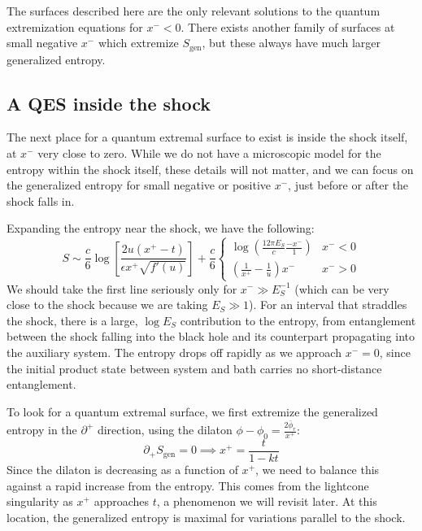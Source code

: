 \documentclass[12pt]{article}
\begin{document}
The surfaces described here are the only relevant solutions to the quantum extremization equations for $x^-<0$. There exists another family of surfaces at small negative $x^-$ which extremize $S_\text{gen}$, but these always have much larger generalized entropy.

\subsection{A QES inside the shock}

The next place for a quantum extremal surface to exist is inside the shock itself, at $x^-$ very close to zero. While we do not have a microscopic model for the entropy within the shock itself, these details will not matter, and we can focus on the generalized entropy for small negative or positive $x^-$, just before or after the shock falls in.

Expanding the entropy near the shock, we have the following:
\begin{equation}
	S \sim \frac{c}{6}\log\left[\frac{2u(x^+-t)}{\epsilon x^+\sqrt{f'(u)}}\right] + \frac{c}{6}\begin{cases}
		\log\left(\frac{12\pi E_S}{ c}  \frac{-x^-}{1}\right) &  x^-<0\\
		\left(\frac{1}{x^+}-\frac{1}{u}\right)x^- & x^- >0
	\end{cases}
\end{equation}
We should take the first line seriously only for $x^- \gg E_S^{-1}$ (which can be very close to the shock because we are taking $E_S\gg 1$). For an interval that straddles the shock, there is a large, $\log E_S$ contribution to the entropy, from entanglement between the shock falling into the black hole and its counterpart propagating into the auxiliary system. The entropy drops off rapidly as we approach $x^-=0$, since the initial product state between system and bath carries no short-distance entanglement.

To look for a quantum extremal surface, we first extremize the generalized entropy in the $\partial^+$ direction, using the dilaton $\phi-\phi_0 = \frac{2\bar{\phi}_r}{x^+}$:
\begin{equation}
	\partial_+ S_\text{gen} =0 \implies x^+ = \frac{t}{1-k t}
\end{equation}
 Since the dilaton is decreasing as a function of $x^+$, we need to balance this against a rapid increase from the entropy. This comes from the lightcone singularity as $x^+$ approaches $t$, a phenomenon we will revisit later. At this location, the generalized entropy is maximal for variations parallel to the shock.
\end{document}
